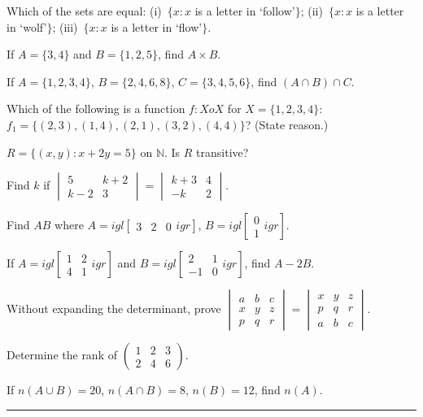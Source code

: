 \documentclass[11pt,a4paper]{article}
\begin{document}
\begin{parts}
  \item Which of the sets are equal: (i)~$\{x:x$ is a letter in `follow'$\}$; (ii)~$\{x:x$ is a letter in `wolf'$\}$; (iii)~$\{x:x$ is a letter in `flow'$\}$.
  \item If $A=\{3,4\}$ and $B=\{1,2,5\}$, find $A \times B$.
  \item If $A=\{1,2,3,4\}$, $B=\{2,4,6,8\}$, $C=\{3,4,5,6\}$, find $(A\cap B)\cap C$.
  \item Which of the following is a function $f:X o X$ for $X=\{1,2,3,4\}$: $f_1=\{(2,3),(1,4),(2,1),(3,2),(4,4)\}$? (State reason.)
  \item $R=\{(x,y):x+2y=5\}$ on $\mathbb{N}$. Is $R$ transitive?
  \item Find $k$ if $
\begin{vmatrix}5&k+2\\k-2&3\end{vmatrix}=
\begin{vmatrix}k+3&4\\-k&2\end{vmatrix}$.
  \item Find $AB$ where $A=igl[
\begin{smallmatrix}3&2&0\end{smallmatrix}igr]$, $B=igl[
\begin{smallmatrix}0\\1\end{smallmatrix}igr]$.
  \item If $A=igl[
\begin{smallmatrix}1&2\\4&1\end{smallmatrix}igr]$ and $B=igl[
\begin{smallmatrix}2&1\\-1&0\end{smallmatrix}igr]$, find $A-2B$.
  \item Without expanding the determinant, prove $
\begin{vmatrix}a&b&c\\x&y&z\\p&q&r\end{vmatrix}=
\begin{vmatrix}x&y&z\\p&q&r\\a&b&c\end{vmatrix}$.
  \item Determine the rank of $
\begin{pmatrix}1&2&3\\2&4&6\end{pmatrix}$.
  \item If $n(A\cup B)=20$, $n(A\cap B)=8$, $n(B)=12$, find $n(A)$.
\end{parts}
\medskip\rule{\linewidth}{0.2pt}
\end{document}
